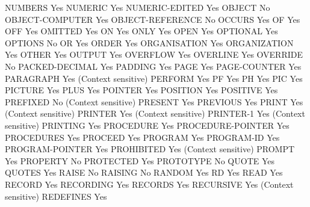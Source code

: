 NUMBERS                         Yes
NUMERIC                         Yes
NUMERIC-EDITED                  Yes
OBJECT                          No
OBJECT-COMPUTER                 Yes
OBJECT-REFERENCE                No
OCCURS                          Yes
OF                              Yes
OFF                             Yes
OMITTED                         Yes
ON                              Yes
ONLY                            Yes
OPEN                            Yes
OPTIONAL                        Yes
OPTIONS                         No
OR                              Yes
ORDER                           Yes
ORGANISATION                    Yes
ORGANIZATION                    Yes
OTHER                           Yes
OUTPUT                          Yes
OVERFLOW                        Yes
OVERLINE                        Yes
OVERRIDE                        No
PACKED-DECIMAL                  Yes
PADDING                         Yes
PAGE                            Yes
PAGE-COUNTER                    Yes
PARAGRAPH                       Yes (Context sensitive)
PERFORM                         Yes
PF                              Yes
PH                              Yes
PIC                             Yes
PICTURE                         Yes
PLUS                            Yes
POINTER                         Yes
POSITION                        Yes
POSITIVE                        Yes
PREFIXED                        No (Context sensitive)
PRESENT                         Yes
PREVIOUS                        Yes
PRINT                           Yes (Context sensitive)
PRINTER                         Yes (Context sensitive)
PRINTER-1                       Yes (Context sensitive)
PRINTING                        Yes
PROCEDURE                       Yes
PROCEDURE-POINTER               Yes
PROCEDURES                      Yes
PROCEED                         Yes
PROGRAM                         Yes
PROGRAM-ID                      Yes
PROGRAM-POINTER                 Yes
PROHIBITED                      Yes (Context sensitive)
PROMPT                          Yes
PROPERTY                        No
PROTECTED                       Yes
PROTOTYPE                       No
QUOTE                           Yes
QUOTES                          Yes
RAISE                           No
RAISING                         No
RANDOM                          Yes
RD                              Yes
READ                            Yes
RECORD                          Yes
RECORDING                       Yes
RECORDS                         Yes
RECURSIVE                       Yes (Context sensitive)
REDEFINES                       Yes
